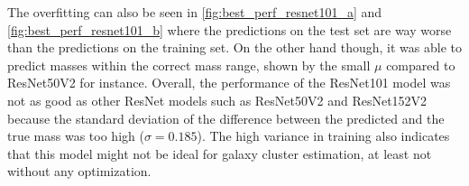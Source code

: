 The overfitting can also be seen in \autoref{fig:best_perf_resnet101_a} and \autoref{fig:best_perf_resnet101_b} where the predictions on the test set are way worse than the predictions on the training set. On the other hand though, it was able to predict masses within the correct mass range, shown by the small $\mu$ compared to ResNet50V2 for instance. Overall, the performance of the ResNet101 model was not as good as other ResNet models such as ResNet50V2 and ResNet152V2 because the standard deviation of the difference between the predicted and the true mass was too high ($\sigma = 0.185$). The high variance in training also indicates that this model might not be ideal for galaxy cluster estimation, at least not without any optimization.
